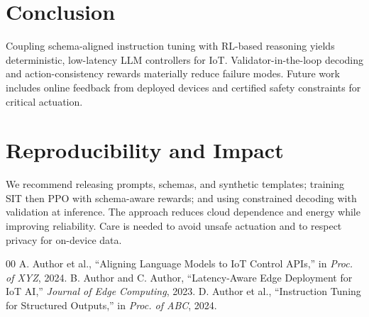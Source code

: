 \documentclass[conference]{IEEEtran}
\begin{document}
\section{Conclusion}
Coupling schema-aligned instruction tuning with RL-based reasoning yields deterministic, low-latency LLM controllers for IoT. Validator-in-the-loop decoding and action-consistency rewards materially reduce failure modes. Future work includes online feedback from deployed devices and certified safety constraints for critical actuation.

\section*{Reproducibility and Impact}
We recommend releasing prompts, schemas, and synthetic templates; training SIT then PPO with schema-aware rewards; and using constrained decoding with validation at inference. The approach reduces cloud dependence and energy while improving reliability. Care is needed to avoid unsafe actuation and to respect privacy for on-device data.


\begin{thebibliography}{00}
 A. Author et al., ``Aligning Language Models to IoT Control APIs,'' in \textit{Proc. of XYZ}, 2024.
 B. Author and C. Author, ``Latency-Aware Edge Deployment for IoT AI,'' \textit{Journal of Edge Computing}, 2023.
 D. Author et al., ``Instruction Tuning for Structured Outputs,'' in \textit{Proc. of ABC}, 2024.
\end{thebibliography}
\end{document}

